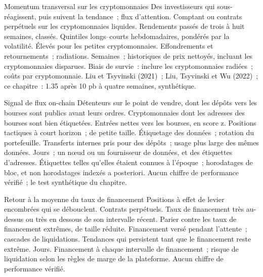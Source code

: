\begin{strategyfile}{Momentum transversal sur les cryptomonnaies}\label{strat:s1:crypto-medium-frequency-strategies:momentum}
 Des investisseurs qui sous-réagissent, puis suivent la tendance~; flux d'attention.
 Comptant ou contrats perpétuels sur les cryptomonnaies liquides.
 Rendements passés de trois à huit semaines, classés.
 Quintiles longs--courts hebdomadaires, pondérés par la volatilité.
 Élevés pour les petites cryptomonnaies.
 Effondrements et retournements~; radiations.
 Semaines~; historiques de prix nettoyés, incluant les cryptomonnaies disparues.
 Biais de survie~: inclure les cryptomonnaies radiées~; coûts par cryptomonnaie.
 Liu et Tsyvinski (2021)~; Liu, Tsyvinski et Wu (2022)~; ce chapitre~: 1.35 après 10 pb à quatre semaines, synthétique.
\end{strategyfile}

\begin{strategyfile}{Signal de flux on-chain}\label{strat:s1:crypto-medium-frequency-strategies:onchain}
 Détenteurs sur le point de vendre, dont les dépôts vers les bourses sont publics avant leurs ordres.
 Cryptomonnaies dont les adresses des bourses sont bien étiquetées.
 Entrées nettes vers les bourses, en score z.
 Positions tactiques à court horizon~; de petite taille.
 Étiquetage des données~; rotation du portefeuille.
 Transferts internes pris pour des dépôts~; usage plus large des mêmes données.
 Jours~; un nœud ou un fournisseur de données, et des étiquettes d'adresses.
 Étiquettes telles qu'elles étaient connues à l'époque~; horodatages de bloc, et non horodatages indexés a posteriori.
 Aucun chiffre de performance vérifié~; le test synthétique du chapitre.
\end{strategyfile}

\begin{strategyfile}{Retour à la moyenne du taux de financement}\label{strat:s1:crypto-medium-frequency-strategies:meanrev}
 Positions à effet de levier encombrées qui se débouclent.
 Contrats perpétuels.
 Taux de financement très au-dessus ou très en dessous de son intervalle récent.
 Parier contre les taux de financement extrêmes, de taille réduite.
 Financement versé pendant l'attente~; cascades de liquidations.
 Tendances qui persistent tant que le financement reste extrême.
 Jours.
 Financement à chaque intervalle de financement~; risque de liquidation selon les règles de marge de la plateforme.
 Aucun chiffre de performance vérifié.
\end{strategyfile}

